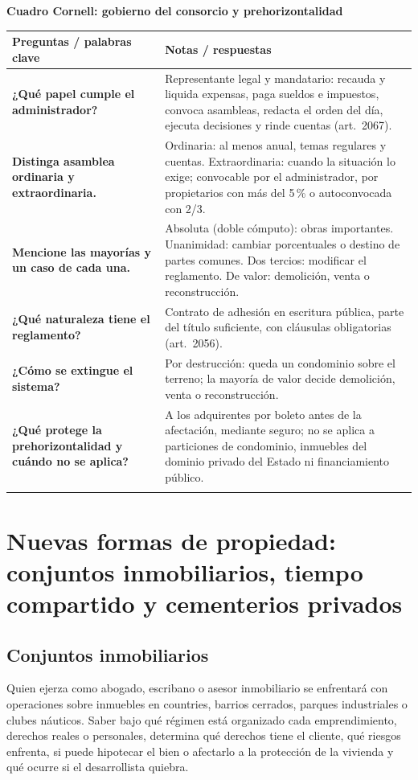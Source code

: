 \documentclass[12pt,oneside]{book}
\renewcommand{\arraystretch}{1.25}
\newcommand{\cq}[2]{\textbf{#1} & #2 \\[0.45em]}
\newcommand{\cornell}[3]{%
\par\bigskip\noindent\textbf{\large Cuadro Cornell: #1}\par\smallskip
\begin{center}
\small
\renewcommand{\arraystretch}{1.15}
\begin{tabularx}{\textwidth}{>{\raggedright\arraybackslash}p{0.27\textwidth}>{\raggedright\arraybackslash}X}
\toprule
\textbf{Preguntas / palabras clave} & \textbf{Notas / respuestas} \\
\midrule
#2
\midrule
\multicolumn{2}{p{\dimexpr\textwidth-2\tabcolsep\relax}}{\textbf{Resumen.} #3} \\
\bottomrule
\end{tabularx}
\end{center}
}
\begin{document}
\cornell{gobierno del consorcio y prehorizontalidad}{
\cq{¿Qué papel cumple el administrador?}{Representante legal y mandatario: recauda y liquida expensas, paga sueldos e impuestos, convoca asambleas, redacta el orden del día, ejecuta decisiones y rinde cuentas (art.~2067).}
\cq{Distinga asamblea ordinaria y extraordinaria.}{Ordinaria: al menos anual, temas regulares y cuentas. Extraordinaria: cuando la situación lo exige; convocable por el administrador, por propietarios con más del 5\,\% o autoconvocada con 2/3.}
\cq{Mencione las mayorías y un caso de cada una.}{Absoluta (doble cómputo): obras importantes. Unanimidad: cambiar porcentuales o destino de partes comunes. Dos tercios: modificar el reglamento. De valor: demolición, venta o reconstrucción.}
\cq{¿Qué naturaleza tiene el reglamento?}{Contrato de adhesión en escritura pública, parte del título suficiente, con cláusulas obligatorias (art.~2056).}
\cq{¿Cómo se extingue el sistema?}{Por destrucción: queda un condominio sobre el terreno; la mayoría de valor decide demolición, venta o reconstrucción.}
\cq{¿Qué protege la prehorizontalidad y cuándo no se aplica?}{A los adquirentes por boleto antes de la afectación, mediante seguro; no se aplica a particiones de condominio, inmuebles del dominio privado del Estado ni financiamiento público.}
}{La voluntad del consorcio se forma en asambleas con mayorías según la trascendencia del acto y la ejecuta el administrador, bajo fiscalización facultativa del consejo. El reglamento es un contrato de adhesión; ante la destrucción subsiste un condominio sobre el terreno, y la prehorizontalidad protege a quienes compran antes de que nazca el derecho real.}

\part{Nuevas formas de propiedad: conjuntos inmobiliarios, tiempo compartido y cementerios privados}

\chapter[Conjuntos inmobiliarios]{Conjuntos inmobiliarios}\label{cap:conjuntos}

Quien ejerza como abogado, escribano o asesor inmobiliario se enfrentará con operaciones sobre inmuebles en countries, barrios cerrados, parques industriales o clubes náuticos. Saber bajo qué régimen está organizado cada emprendimiento, derechos reales o personales, determina qué derechos tiene el cliente, qué riesgos enfrenta, si puede hipotecar el bien o afectarlo a la protección de la vivienda y qué ocurre si el desarrollista quiebra.
\end{document}
